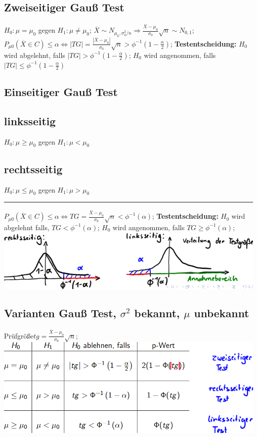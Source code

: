 \subsection{Zweiseitiger Gauß Test}
$ H_{0}: \mu = \mu_{0}  $ gegen $ H_{1}: \mu \neq \mu_{0} $; 
$ \overline{ X } \sim  N_{ \mu_{0}, \sigma_{0}^2 /n} \Rightarrow \frac{ \overline{X} - \mu_{0} }{ \sigma_{0} } \sqrt{n} \sim N_{0, 1} $; 
$ P_{ \mu0}( \overline{X} \in C ) \le \alpha \Leftrightarrow |TG| = \frac{ | \overline{X} - \mu_{0} | }{ \sigma_{0} } \sqrt{n} > \phi^{-1}(1-\frac{ \alpha}{2} )$; 
\textbf{Testentscheidung:} $ H_{0} $ wird abgelehnt, falls $ |TG| > \phi^{-1}(1-\frac{ \alpha }{ 2 } ) $; $ H_{0} $ wird angenommen, falls $ |TG| \le \phi^{-1}(1-\frac{ \alpha }{2} )$
\subsection{Einseitiger Gauß Test}
\subsection{linksseitig}
$ H_{0}: \mu \ge \mu_{0} $ gegen $ H_{1}: \mu  < \mu_{0}$
\subsection{rechtsseitig}
$ H_{0}: \mu \le \mu_{0} $ gegen $ H_{1}: \mu > \mu_{0} $
\hrule
$ P_{\mu 0} ( \overline{X} \in C ) \le \alpha \Leftrightarrow TG = \frac{ \overline{ X } - \mu_{0} }{ \sigma_{0} } \sqrt{n} < \phi^{-1} ( \alpha ) $; 
\textbf{Testentscheidung:} $ H_{0} $ wird abgelehnt falls, $ TG < \phi^{-1} ( \alpha )$; 
$ H_{0} $ wird angenommen, falls $ TG \ge \phi^{-1} ( \alpha ) $; 
\includegraphics[scale=0.25]{./pic/EinseitigerGausTest.png}
\subsection{Varianten Gauß Test, $ \sigma^2 $ bekannt, $\mu$ unbekannt}
Prüfgröße$ tg = \frac{ \overline{X} - \mu_{0} }{ \sigma_{0} }\sqrt{n} $; \\
\includegraphics[scale=0.25]{./pic/GausTests.png}
